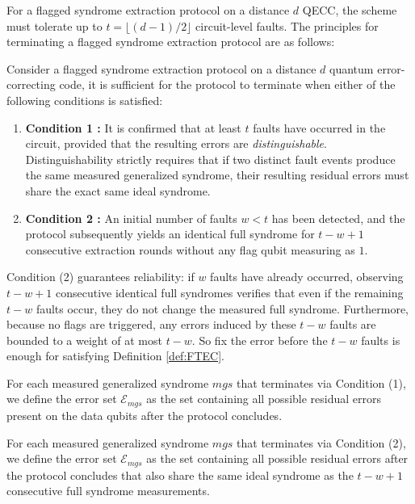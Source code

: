 \documentclass[acmsmallw,review]{acmart}
\begin{document}
For a flagged syndrome extraction protocol on a distance $d$ QECC, the scheme must tolerate up to $t = \lfloor (d-1)/2 \rfloor$ circuit-level faults. The principles for terminating a flagged syndrome extraction protocol are as follows:

\begin{proposition}
\label{prop:termination}
Consider a flagged syndrome extraction protocol on a distance $d$ quantum error-correcting code, it is sufficient for the protocol to terminate when either of the following conditions is satisfied:
\begin{enumerate}
    \item \textbf{Condition 1 :} It is confirmed that at least $t$ faults have occurred in the circuit, provided that the resulting errors are \textit{distinguishable}. Distinguishability strictly requires that if two distinct fault events produce the same measured generalized syndrome, their resulting residual errors must share the exact same ideal syndrome.
    \item \textbf{Condition 2 :} An initial number of faults $w < t$ has been detected, and the protocol subsequently yields an identical full syndrome for $t-w+1$ consecutive extraction rounds without any flag qubit measuring as $1$.
\end{enumerate}
\end{proposition}

Condition (2) guarantees reliability: if $w$ faults have already occurred, observing $t-w+1$ consecutive identical full syndromes verifies that even if the remaining $t-w$ faults occur, they do not change the measured full syndrome. Furthermore, because no flags are triggered, any errors induced by these $t-w$ faults are bounded to a weight of at most $t-w$. So fix the error before the $t-w $ faults is enough for satisfying Definition \ref{def:FTEC}.

\begin{definition}
\label{def:error-set-cond-1}
    For each measured generalized syndrome $mgs$ that terminates via Condition (1), we define the error set $\mathcal{E}_{mgs}$ as the set containing all possible residual errors present on the data qubits after the protocol concludes.
\end{definition}

\begin{definition}
\label{def:error-set-cond-2}
    For each measured generalized syndrome $mgs$ that terminates via Condition (2), we define the error set $\mathcal{E}_{mgs}$ as the set containing all possible residual errors after the protocol concludes that also share the same ideal syndrome as the $t-w+1$ consecutive full syndrome measurements.
\end{definition}
\end{document}
